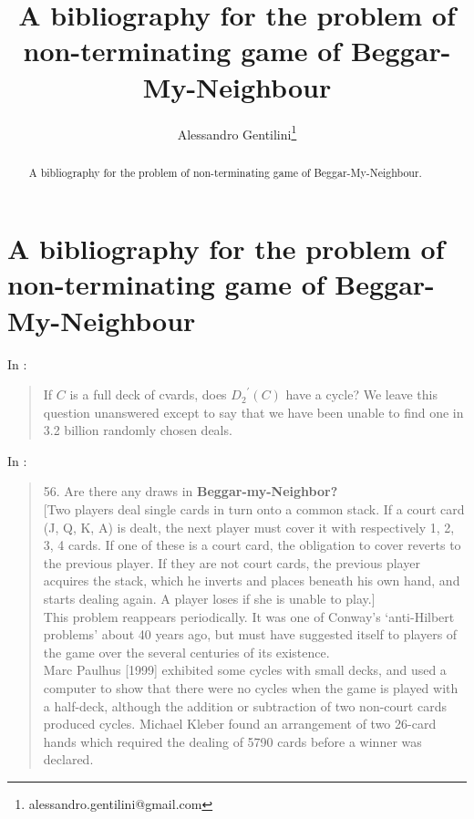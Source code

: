 \documentclass[a4paper,12pt]{article}
\title{A bibliography for the problem of non-terminating game of Beggar-My-Neighbour}
\author{Alessandro Gentilini\thanks{alessandro.gentilini@gmail.com}}
\begin{document}
\maketitle

\begin{abstract}
A bibliography for the problem of non-terminating game of Beggar-My-Neighbour.
\end{abstract} 

\section{A bibliography for the problem of non-terminating game of 
Beggar-My-Neighbour}

In \cite[p.164]{paulhus1999beggar}:
\begin{quotation}
If $C$ is a full deck of cvards, does ${D_{2}}^{'}(C)$ have a cycle? We leave 
this question unanswered except to say that we have been unable to find one in 
3.2 billion randomly chosen deals.
\end{quotation}

In \cite[p.472]{nowakowski2002more}:
\begin{quotation}
56. Are there any draws in \textbf{Beggar-my-Neighbor?}\\ 

[Two players deal single cards in turn onto a common stack. If a court card (J,
Q, K, A) is dealt, the next player must cover it with respectively 1, 2, 3, 4 
cards. If one of these is a court card, the obligation to cover reverts to the 
previous player. If they are not court cards, the previous player acquires the 
stack, which he inverts and places beneath his own hand, and starts dealing 
again. A player loses if she is unable to play.]\\

This problem reappears periodically. It was one of Conway’s 
‘anti-Hilbert problems’ about 40 years ago, but must have suggested itself to 
players of the game over the several centuries of its existence.\\

Marc Paulhus [1999] exhibited some cycles with small decks, and used a computer 
to show that there were no cycles when the game is played with a half-deck, 
although the addition or subtraction of two non-court cards produced cycles. 
Michael Kleber found an arrangement of two 26-card hands which required the 
dealing of 5790 cards before a winner was declared.
\end{quotation}
\end{document}
